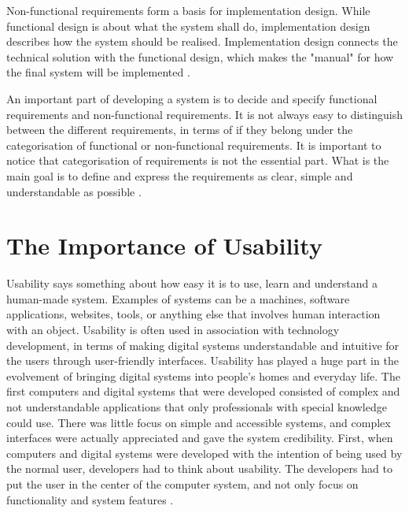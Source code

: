Non-functional requirements form a basis for implementation design. While functional design is about what the system shall do, implementation design describes how the system should be realised. Implementation design connects the technical solution with the functional design, which makes the "manual" for how the final system will be implemented \cite{systemutviklingDel1}.  

An important part of developing a system is to decide and specify functional requirements and non-functional requirements. It is not always easy to distinguish between the different requirements, in terms of if they belong under the categorisation of functional or non-functional requirements. It is important to notice that categorisation of requirements is not the essential part. What is the main goal is to define and express the requirements as clear, simple and understandable as possible \cite{systemutviklingDel1}.  

\section{The Importance of Usability}
\label{sec:usability}
Usability says something about how easy it is to use, learn and understand a human-made system. Examples of systems can be a machines, software applications, websites, tools, or anything else that involves human interaction with an object. Usability is often used in association with technology development, in terms of making digital systems understandable and intuitive for the users through user-friendly interfaces. Usability has played a huge part in the evolvement of bringing digital systems into people's homes and everyday life. The first computers and digital systems that were developed consisted of complex and not understandable applications that only professionals with special knowledge could use. There was little focus on simple and accessible systems, and complex interfaces were actually appreciated and gave the system credibility. First, when computers and digital systems were developed with the intention of being used by the normal user, developers had to think about usability. The developers had to put the user in the center of the computer system, and not only focus on functionality and system features \cite{mmi}.

